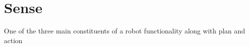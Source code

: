 \chapter{Sense}
One of the three main constituents of a robot functionality along with plan and action